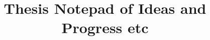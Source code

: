 \documentclass[12pt]{book}
\newcommand{\N}{\mathbb{N}}
\begin{document}
\title{Thesis Notepad of Ideas and Progress etc}
\maketitle
\tableofcontents
\begin{comment}
\chapter{Math formulation of ideas}
\section{Adam Ideas}
The Adam algorithm is applied in the following way. \\
For each iteration $t\in\N$, let $g^{t} := \nabla_{w}L(w)$. The update step is given by 

\begin{align*}
	m^{t+1} &= \beta_1 m^{t} + (1-\beta_1)g^{t} \\
	v^{t+1} &= \beta_2 v^{t} + (1-\beta_2) g^{t} \odot g^{t}\\
	\hat{m}^{t+1} &= \frac{1}{1-\beta_1^{t+1}} m^{t+1} \quad , \quad \hat{v}^{t+1} = \frac{1}{1-\beta_2^{t+1}} v^{t+1}\\
	w^{t+1} &= w^{t} - \eta \frac{\hat{m}^{t+1}}{\sqrt{\hat{v}^{t+1}} +\varepsilon }
\end{align*}

\subsection*{LR scheduler ideas}
It is sometimes the case that a learning rate scheduler $(\eta_{j})_{j\in\N} $ is used in conjunction with Adam. One could also encode a decreasing (resp. increasing) step size by changing the $\varepsilon $ parameter with time. 
\\
Namely, one has update steps of the form 
\[
w^{t+1} = w^{t} - \eta \frac{\hat{m}^{t+1}}{\sqrt{\hat{v}^{t+1}} + \varepsilon_t} \quad \text{instead of} \quad w^{t+1} = w^{t} - \eta_t \frac{\hat{m}^{t+1}}{\sqrt{\hat{v}^{t+1}} +\varepsilon }
\] 
\subsubsection*{probably stupid}
Easiest way to alter the existing adam method in torch is just to find the equivalent learning rate schedule which corresponds to a given  $\varepsilon $ schedule. \\ 	
More explicitely, given some sequence $(\varepsilon _{t})_{t\ge_0} $ and $\eta >0$, what sequence $(\eta_{t})_{t\ge_0 } $ is such that 
\[
w^{t+1} = w^{t} - \eta \frac{\hat{m}^{t+1}}{\sqrt{\hat{v}^{t+1}} + \varepsilon_t} \quad \text{is equialent to} \quad w^{t+1} = w^{t} - \eta_t \frac{\hat{m}^{t+1}}{\sqrt{\hat{v}^{t+1}} +\varepsilon_0 }
\] 
Solving would give:
\[
\eta_t = \frac{(\eta - \eta_t)\sqrt{\text{EMA}_{\beta_2}(g_t^2)} + \eta \varepsilon_0   }{\varepsilon _t}
\]
Ok definitely stupid: can't know lr ahead of time. 
Will just implement directly in torch.

\end{comment}
\end{document}
